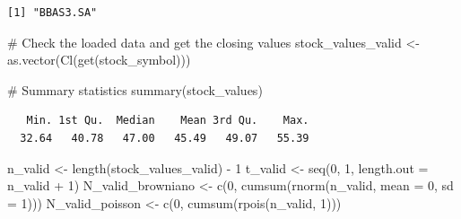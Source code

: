 \documentclass[
  letterpaper,
  DIV=11,
  numbers=noendperiod]{scrreprt}
\newenvironment{Shaded}{\begin{snugshade}}{\end{snugshade}}
\newcommand{\AttributeTok}[1]{\textcolor[rgb]{0.40,0.45,0.13}{#1}}
\newcommand{\CommentTok}[1]{\textcolor[rgb]{0.37,0.37,0.37}{#1}}
\newcommand{\DecValTok}[1]{\textcolor[rgb]{0.68,0.00,0.00}{#1}}
\newcommand{\FunctionTok}[1]{\textcolor[rgb]{0.28,0.35,0.67}{#1}}
\newcommand{\NormalTok}[1]{\textcolor[rgb]{0.00,0.23,0.31}{#1}}
\newcommand{\OtherTok}[1]{\textcolor[rgb]{0.00,0.23,0.31}{#1}}
\newcommand{\SpecialCharTok}[1]{\textcolor[rgb]{0.37,0.37,0.37}{#1}}
\begin{document}
\begin{verbatim}
[1] "BBAS3.SA"
\end{verbatim}

\begin{Shaded}
\begin{Highlighting}[]
\CommentTok{\# Check the loaded data and get the closing values}
\NormalTok{stock\_values\_valid }\OtherTok{\textless{}{-}} \FunctionTok{as.vector}\NormalTok{(}\FunctionTok{Cl}\NormalTok{(}\FunctionTok{get}\NormalTok{(stock\_symbol)))}

\CommentTok{\# Summary statistics}
\FunctionTok{summary}\NormalTok{(stock\_values)}
\end{Highlighting}
\end{Shaded}

\begin{verbatim}
   Min. 1st Qu.  Median    Mean 3rd Qu.    Max. 
  32.64   40.78   47.00   45.49   49.07   55.39 
\end{verbatim}

\begin{Shaded}
\begin{Highlighting}[]
\NormalTok{n\_valid }\OtherTok{\textless{}{-}} \FunctionTok{length}\NormalTok{(stock\_values\_valid) }\SpecialCharTok{{-}} \DecValTok{1}
\NormalTok{t\_valid }\OtherTok{\textless{}{-}} \FunctionTok{seq}\NormalTok{(}\DecValTok{0}\NormalTok{, }\DecValTok{1}\NormalTok{, }\AttributeTok{length.out =}\NormalTok{ n\_valid }\SpecialCharTok{+} \DecValTok{1}\NormalTok{)}
\NormalTok{N\_valid\_browniano }\OtherTok{\textless{}{-}} \FunctionTok{c}\NormalTok{(}\DecValTok{0}\NormalTok{, }\FunctionTok{cumsum}\NormalTok{(}\FunctionTok{rnorm}\NormalTok{(n\_valid, }\AttributeTok{mean =} \DecValTok{0}\NormalTok{, }\AttributeTok{sd =} \DecValTok{1}\NormalTok{)))}
\NormalTok{N\_valid\_poisson }\OtherTok{\textless{}{-}} \FunctionTok{c}\NormalTok{(}\DecValTok{0}\NormalTok{, }\FunctionTok{cumsum}\NormalTok{(}\FunctionTok{rpois}\NormalTok{(n\_valid, }\DecValTok{1}\NormalTok{)))}
\end{Highlighting}
\end{Shaded}
\end{document}
